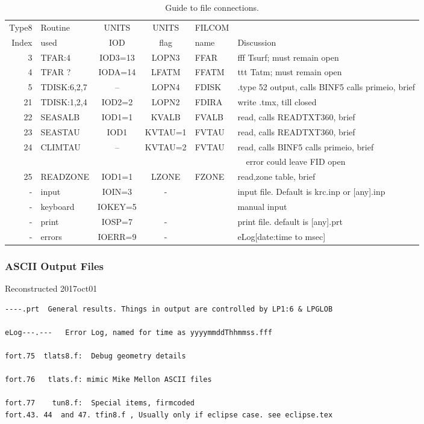 \documentclass{article}
\begin{document}
\begin{table} 
\caption{Guide to file connections.}
\label{filecon.tab}
\begin{center} \begin{tabular}{ | r l c c l l | } \hline
Type8 & Routine & UNITS & UNITS & FILCOM &   \\
Index & used    & IOD  & flag & name   & Discussion \\  \hline
 3 & TFAR:4     & IOD3=13 & LOPN3 & FFAR & fff Tsurf; must remain open \\
 4 & TFAR ?      & IODA=14  & LFATM  & FFATM  & ttt Tatm;  must remain open \\
 5 & TDISK:6,2,7 & --  & LOPN4 & FDISK  & .type 52 output, calls BINF5 calls primeio, brief \\  
21 & TDISK:1,2,4 & IOD2=2  & LOPN2 & FDIRA & write .tmx, till closed \\
22 & SEASALB  & IOD1=1  & KVALB & FVALB & read, calls READTXT360, brief \\
23 & SEASTAU  & IOD1  & KVTAU=1 & FVTAU & read, calls READTXT360, brief \\
24 & CLIMTAU  & --    & KVTAU=2 & FVTAU & read, calls BINF5 calls primeio, brief \\  
   &          &     & &       & \ \  error could leave FID open \\
25 & READZONE & IOD1=1  &  LZONE & FZONE & read,zone table, brief  \\
- & input & IOIN=3 & - &  & input file. Default is krc.inp or [any].inp \\
- & keyboard & IOKEY=5 & & & manual input \\
- & print & IOSP=7 & - & & print file. default is [any].prt \\
- & errors & IOERR=9 & - &  & eLog[date:time to msec] \\ 
 \hline  \end{tabular} \end{center} \end{table}


\subsubsection{ASCII Output Files} %
Reconstructed  2017oct01
\vspace{-3.mm}
\begin{verbatim}
----.prt  General results. Things in output are controlled by LP1:6 & LPGLOB

eLog---.---   Error Log, named for time as yyyymmddThhmmss.fff

fort.75  tlats8.f:  Debug geometry details

fort.76   tlats.f: mimic Mike Mellon ASCII files

fort.77    tun8.f:  Special items, firmcoded
fort.43. 44  and 47. tfin8.f , Usually only if eclipse case. see eclipse.tex 

\end{verbatim}
\end{document}
